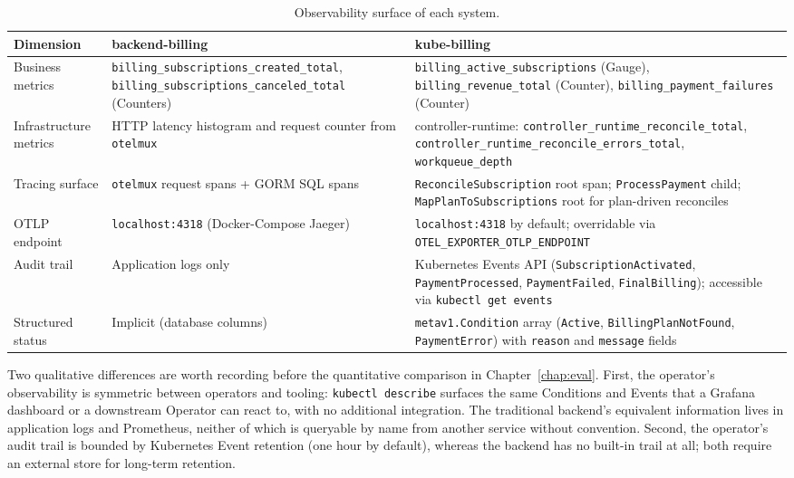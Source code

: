\begin{table}[h]
\centering
\small
\caption{Observability surface of each system.}
\label{tab:obs-summary}
\begin{tabularx}{\textwidth}{@{}lXX@{}}
\toprule
\textbf{Dimension} & \textbf{backend-billing} & \textbf{kube-billing} \\ \midrule
Business metrics &
\texttt{billing\_subscriptions\_created\_total}, \texttt{billing\_subscriptions\_canceled\_total} (Counters) &
\texttt{billing\_active\_subscriptions} (Gauge), \texttt{billing\_revenue\_total} (Counter), \texttt{billing\_payment\_failures} (Counter) \\
Infrastructure metrics &
HTTP latency histogram and request counter from \texttt{otelmux} &
controller-runtime: \texttt{controller\_runtime\_reconcile\_total}, \texttt{controller\_runtime\_reconcile\_errors\_total}, \texttt{workqueue\_depth} \\
Tracing surface &
\texttt{otelmux} request spans + GORM SQL spans &
\texttt{ReconcileSubscription} root span; \texttt{ProcessPayment} child; \texttt{MapPlanToSubscriptions} root for plan-driven reconciles \\
OTLP endpoint &
\texttt{localhost:4318} (Docker-Compose Jaeger) &
\texttt{localhost:4318} by default; overridable via \texttt{OTEL\_EXPORTER\_OTLP\_ENDPOINT} \\
Audit trail &
Application logs only &
Kubernetes Events API (\texttt{SubscriptionActivated}, \texttt{PaymentProcessed}, \texttt{PaymentFailed}, \texttt{FinalBilling}); accessible via \texttt{kubectl get events} \\
Structured status &
Implicit (database columns) &
\texttt{metav1.Condition} array (\texttt{Active}, \texttt{BillingPlanNotFound}, \texttt{PaymentError}) with \texttt{reason} and \texttt{message} fields \\
\bottomrule
\end{tabularx}
\end{table}

Two qualitative differences are worth recording before the quantitative comparison in Chapter~\ref{chap:eval}. First, the operator's observability is symmetric between operators and tooling: \texttt{kubectl describe} surfaces the same Conditions and Events that a Grafana dashboard or a downstream Operator can react to, with no additional integration. The traditional backend's equivalent information lives in application logs and Prometheus, neither of which is queryable by name from another service without convention. Second, the operator's audit trail is bounded by Kubernetes Event retention (one hour by default), whereas the backend has no built-in trail at all; both require an external store for long-term retention.

